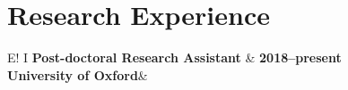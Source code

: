 \documentclass[11pt,a4paper]{article}
\newcommand\VRule{\color{lightgray}\vrule width 0.5pt}
\begin{document}

\section*{Research Experience}
\noindent

\noindent\begin{tabular}{E!{\VRule} I }
{\bf Post-doctoral Research Assistant}   & {\bf 2018--present}\\
{\bf University of Oxford}&\\
\end{tabular}
\end{document}

